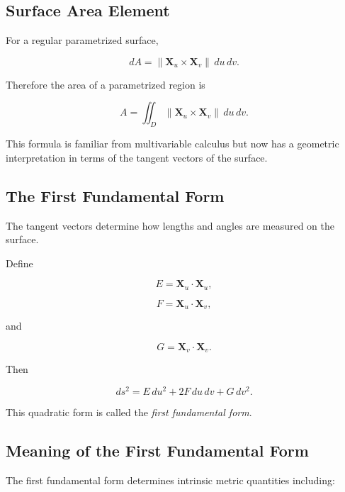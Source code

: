 \subsection{Surface Area Element}
\label{subsec:surface-area-element}

For a regular parametrized surface,

\[
\boxed{
dA
=
\|\mathbf{X}_u\times\mathbf{X}_v\|
\,du\,dv.
}
\]

Therefore the area of a parametrized region is

\[
\boxed{
A
=
\iint_D
\|\mathbf{X}_u\times\mathbf{X}_v\|
\,du\,dv.
}
\]

This formula is familiar from multivariable calculus but now has a geometric
interpretation in terms of the tangent vectors of the surface.

\subsection{The First Fundamental Form}
\label{subsec:first-fundamental-form}

The tangent vectors determine how lengths and angles are measured on the
surface.

Define

\[
\boxed{
E=\mathbf{X}_u\cdot\mathbf{X}_u,
}
\]

\[
\boxed{
F=\mathbf{X}_u\cdot\mathbf{X}_v,
}
\]

and

\[
\boxed{
G=\mathbf{X}_v\cdot\mathbf{X}_v.
}
\]

Then

\[
\boxed{
ds^2
=
E\,du^2
+
2F\,du\,dv
+
G\,dv^2.
}
\]

This quadratic form is called the \emph{first fundamental form}.

\subsection{Meaning of the First Fundamental Form}
\label{subsec:first-form-meaning}

The first fundamental form determines intrinsic metric quantities including:

